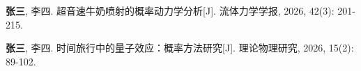 \begin{publications}

\pubitem \textbf{张三}, 李四. 超音速牛奶喷射的概率动力学分析[J]. 流体力学学报, 2026, 42(3): 201-215.

\pubitem \textbf{张三}, 李四. 时间旅行中的量子效应：概率方法研究[J]. 理论物理研究, 2026, 15(2): 89-102.

\end{publications}
